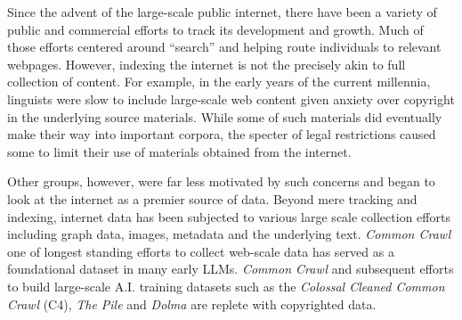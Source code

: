 Since the advent of the large-scale public internet, there have been a variety of public and commercial efforts to track its development and growth.\cite{mcmurdo1995internet}\cite{alnoamany2014and}  Much of those efforts centered around ``search'' and helping route individuals to relevant webpages. However, indexing the internet is not the precisely akin to full collection of content.  For example, in the early years of the current millennia, linguists were slow to include large-scale web content given anxiety over copyright in the underlying source materials.\cite{ide2002american}  While some of such materials did eventually make their way into important corpora,\cite{ide2008american} the specter of legal restrictions caused some to limit their use of materials obtained from the internet. 

Other groups, however, were far less motivated by such concerns and began to look at the internet as a premier source of data.  Beyond mere tracking and indexing, internet data has been subjected to various large scale collection efforts including graph data, images, metadata and the underlying text.\cite{buck2014n}\cite{leskovec2016snap}\cite{deng2009imagenet}  \textit{Common Crawl}\cite{smith2013dirt} one of longest standing efforts to collect web-scale data has served as a foundational dataset in many early LLMs. \textit{Common Crawl} and subsequent efforts to build large-scale A.I. training datasets such as the \textit{Colossal Cleaned Common Crawl} (C4)\cite{raffel2020exploring}, \textit{The Pile}\cite{gao2020pile} and \textit{Dolma}\cite{soldaini-etal-2024-dolma} are replete with copyrighted data. 


